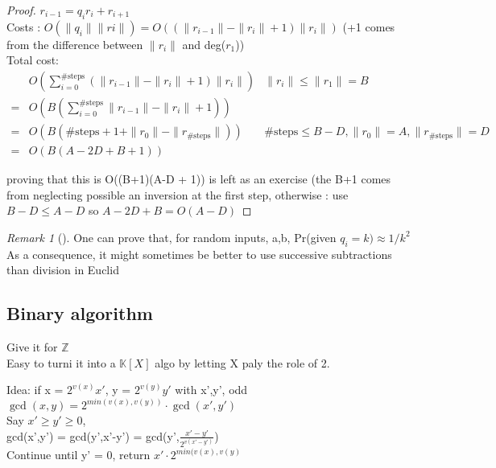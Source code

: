 \documentclass{article}
\theoremstyle{definition}
\theoremstyle{remark}
\newtheorem*{remark}{Remark}
\newcommand{\Rem}[3]{\begin{remark}[#1]\label{#2}#3\end{remark}}
\newcommand{\Proof}[1]{\begin{proof}#1\end{proof}}
\newcommand{\Z}{\mathbb{Z}}
\newcommand{\K}{\mathbb{K}}
\begin{document}
\Proof{
	$r_{i-1} = q_ir_i + r_{i+1}$\\
	Costs : $O(\|q_i \| \| ri \|) = O((\|r_{i-1}\| - \|r_i \| + 1)\|r_i\|)$ (+1 comes from the difference between $\|r_i\|$ and deg($r_1$))\\
	
	Total cost:
	\begin{align*}
		&O(\sum\limits_{i = 0}^{\#\text{steps}} (\|r_{i-1} \| - \|r_i\| + 1)\|r_i\|) & \|r_i\| \leq \|r_1\| = B\\
		=& O(B(\sum\limits_{i = 0}^{\#\text{steps}} \|r_{i-1} \| - \|r_i\| + 1))\\
		=& O(B(\#\text{steps}+1 + \|r_0\| - \|r_{\#\text{steps}}\|)) &\#\text{steps} \leq B-D, \|r_0\| = A, \|r_{\#\text{steps}}\| = D\\
		=& O(B(A-2D+B+1))
	\end{align*}
	
	proving that this is O((B+1)(A-D + 1)) is left as an exercise (the B+1 comes from neglecting possible an inversion at the first step, otherwise : use $B-D \leq A-D$ so $A-2D+B = O(A-D)$}

\Rem{}{}{One can prove that, for random inputs, a,b, Pr(given $q_i = k) \approx 1/k^2$\\
	As a consequence, it might sometimes be better to use successive subtractions than division in Euclid}

\subsection{Binary algorithm}
Give it for $\Z$\\
Easy to turni it into a $\K[X]$ algo by letting X paly the role of 2.

Idea: if x = $2^{v(x)}x'$, y = $2^{v(y)}y'$ with x',y', odd\\
$\gcd(x,y) = 2^{min(v(x),v(y))}\cdot\gcd(x',y')$\\
Say $x'\geq y'\geq 0$,\\
gcd(x',y') = gcd(y',x'-y') = gcd(y',$\frac{x'-y'}{2^{v(x'-y')}}$)\\
Continue until y' = 0, return $x'\cdot 2^{min(v(x),v(y)}$\\
\end{document}
